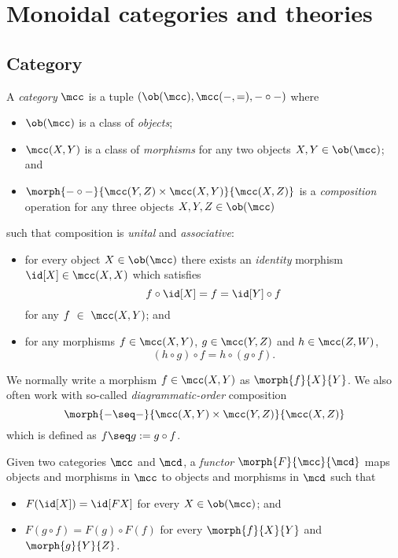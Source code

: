 \chapter{Monoidal categories and theories}

\section{Category}

\begin{definition}[Category]
    A \emph{category} \(\mcc\) is a tuple \((\ob(\mcc), \mcc(-,=), - \circ -)\)
    where
    \begin{itemize}
        \item \(\ob(\mcc)\) is a class of \emph{objects};
        \item \(\mcc(X, Y)\) is a class of \emph{morphisms} for any two objects
                        \(X, Y \in \ob(\mcc)\); and
        \item \(
                    \morph{- \circ -}{\mcc(Y, Z) \times \mcc(X, Y)}{\mcc(X, Z)}
                \) is a \emph{composition} operation for any three objects \(
                    X, Y, Z \in \ob(\mcc)
                \)
    \end{itemize}
    such that composition is \emph{unital} and \emph{associative}:
    \begin{itemize}
        \item for every object \(X \in \ob(\mcc)\) there exists an
                \emph{identity} morphism \(\id[X] \in \mcc(X, X)\) which
                satisfies \[
                    f \circ \id[X] = f = \id[Y] \circ f
                \] for any \(f~\in~\mcc(X, Y)\); and
        \item for any morphisms \(
                    f \in \mcc(X, Y)
                \), \(
                    g \in \mcc(Y, Z)
                \) and \(h \in \mcc(Z, W)\), \[
                    (h \circ g) \circ f = h \circ (g \circ f).
                \]
    \end{itemize}
\end{definition}

We normally write a morphism \(f \in \mcc(X, Y)\) as \(\morph{f}{X}{Y}\).
We also often work with so-called \emph{diagrammatic-order} composition \[
    \morph{- \seq -}{\mcc(X, Y) \times \mcc(Y, Z)}{\mcc(X, Z)}
\] which is defined as \(f \seq g := g \circ f\).

\begin{definition}[Functor]
    Given two categories \(\mcc\) and \(\mcd\), a \emph{functor} \(
        \morph{F}{\mcc}{\mcd}
    \) maps objects and morphisms in \(\mcc\) to objects and morphisms in
    \(\mcd\) such that
    \begin{itemize}
        \item \(F(\id[X]) = \id[FX]\) for every \(X \in \ob(\mcc)\); and
        \item \(F(g \circ f) = F(g) \circ F(f)\) for every \(\morph{f}{X}{Y}\)
        and \(\morph{g}{Y}{Z}\).
    \end{itemize}
\end{definition}



